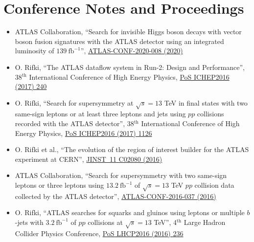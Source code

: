 \documentclass[a4paper,10pt]{article}
\begin{document}
\section{Conference Notes and Proceedings}

\begin{itemize}
	\item ATLAS Collaboration,
	``Search for invisible Higgs boson decays with vector boson fusion signatures with the ATLAS detector using an integrated luminosity of  $139\ \mathrm{fb}^{-1}$'',
	\href{https://atlas.web.cern.ch/Atlas/GROUPS/PHYSICS/CONFNOTES/ATLAS-CONF-2020-008/}{ATLAS-CONF-2020-008 (2020)}
	\item O. Rifki,
	``The ATLAS dataflow system in Run-2: Design and Performance'',
	38$^{\mathrm{th}}$ International Conference of High Energy Physics,
	\href{https://pos.sissa.it/282/240/pdf}{PoS ICHEP2016 (2017) 240}
	\item O. Rifki,
	``Search for supersymmetry at $\sqrt{s} = 13$ TeV in final states with two same-sign leptons or at least three leptons and jets using $pp$ collisions recorded with the ATLAS detector'',
	38$^{\mathrm{th}}$ International Conference of High Energy Physics,
	\href{https://pos.sissa.it/282/1126/pdf}{PoS ICHEP2016 (2017) 1126}
  \item O. Rifki et al.,
  ``The evolution of the region of interest builder for the ATLAS experiment at CERN'',
  \href{https://iopscience.iop.org/article/10.1088/1748-0221/11/02/C02080}{JINST\ 11 C02080 (2016) }
	\item ATLAS Collaboration,
	``Search for supersymmetry with two same-sign leptons or three leptons using $13.2\ \mathrm{fb}^{-1}$ of $\sqrt{s} = 13$ TeV $pp$ collision data collected by the ATLAS detector'',
	\href{https://atlas.web.cern.ch/Atlas/GROUPS/PHYSICS/CONFNOTES/ATLAS-CONF-2016-037/}{ATLAS-CONF-2016-037 (2016)}
	\item O. Rifki,
	``ATLAS searches for squarks and gluinos using leptons or multiple $b$-jets with $3.2\ \mathrm{fb}^{-1}$ of $pp$ collisions at $\sqrt{s} = 13$ TeV'',
	4$^{\mathrm{th}}$ Large Hadron Collider Physics Conference,
	\href{https://pos.sissa.it/276/236/pdf}{PoS LHCP2016 (2016) 236}
\end{itemize}

\vspace{3mm}
\end{document}
